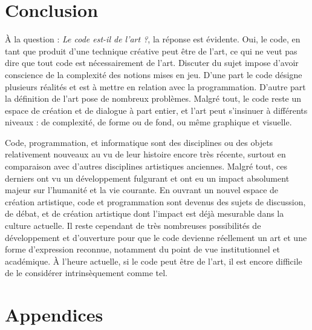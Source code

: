 \documentclass[12pt]{article} %
\begin{document}
\section{Conclusion}
À la question : \textit{Le code est-il de l'art ?}, la réponse est évidente. Oui, le code, en tant que produit d'une technique créative peut être de l'art, ce qui ne veut pas dire que tout code est nécessairement de l'art. Discuter du sujet impose d'avoir conscience de la complexité des notions mises en jeu. D'une part le code désigne plusieurs réalités et est à mettre en relation avec la programmation. D'autre part la définition de l'art pose de nombreux problèmes. Malgré tout, le code reste un espace de création et de dialogue à part entier, et l'art peut s'insinuer à différents niveaux : de complexité, de forme ou de fond, ou même graphique et visuelle.

Code, programmation, et informatique sont des disciplines ou des objets relativement nouveaux au vu de leur histoire encore très récente, surtout en comparaison avec d'autres disciplines artistiques anciennes. Malgré tout, ces derniers ont vu un développement fulgurant et ont eu un impact absolument majeur sur l'humanité et la vie courante. En ouvrant un nouvel espace de création artistique, code et programmation sont devenus des sujets de discussion, de débat, et de création artistique dont l'impact est déjà mesurable dans la culture actuelle. Il reste cependant de très nombreuses possibilités de développement et d'ouverture pour que le code devienne réellement un art et une forme d'expression reconnue, notamment du point de vue institutionnel et académique. À l'heure actuelle, si le code peut être de l'art, il est encore difficile de le considérer intrinsèquement comme tel.

\newpage
\section{Appendices}

\printglossary[type=\acronymtype]

\printglossary


\newpage



\restoregeometry
\end{document}
